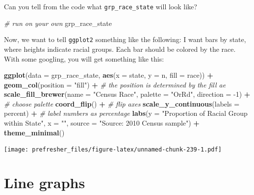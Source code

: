 \documentclass[
]{book}
\newenvironment{Shaded}{\begin{snugshade}}{\end{snugshade}}
\newcommand{\CommentTok}[1]{\textcolor[rgb]{0.56,0.35,0.01}{\textit{#1}}}
\newcommand{\DataTypeTok}[1]{\textcolor[rgb]{0.13,0.29,0.53}{#1}}
\newcommand{\DecValTok}[1]{\textcolor[rgb]{0.00,0.00,0.81}{#1}}
\newcommand{\KeywordTok}[1]{\textcolor[rgb]{0.13,0.29,0.53}{\textbf{#1}}}
\newcommand{\NormalTok}[1]{#1}
\newcommand{\OperatorTok}[1]{\textcolor[rgb]{0.81,0.36,0.00}{\textbf{#1}}}
\newcommand{\StringTok}[1]{\textcolor[rgb]{0.31,0.60,0.02}{#1}}
\theoremstyle{definition}
\theoremstyle{definition}
\theoremstyle{definition}
\theoremstyle{remark}
\begin{document}
Can you tell from the code what \texttt{grp\_race\_state} will look like?

\begin{Shaded}
\begin{Highlighting}[]
\CommentTok{\# run on your own}
\NormalTok{grp\_race\_state}
\end{Highlighting}
\end{Shaded}

Now, we want to tell \texttt{ggplot2} something like the following: I want bars by state, where heights indicate racial groups. Each bar should be colored by the race. With some googling, you will get something like this:

\begin{Shaded}
\begin{Highlighting}[]
\KeywordTok{ggplot}\NormalTok{(}\DataTypeTok{data =}\NormalTok{ grp\_race\_state, }\KeywordTok{aes}\NormalTok{(}\DataTypeTok{x =}\NormalTok{  state, }\DataTypeTok{y =}\NormalTok{ n,  }\DataTypeTok{fill =}\NormalTok{ race)) }\OperatorTok{+}
\StringTok{  }\KeywordTok{geom\_col}\NormalTok{(}\DataTypeTok{position =} \StringTok{"fill"}\NormalTok{) }\OperatorTok{+}\StringTok{ }\CommentTok{\# the position is determined by the fill ae}
\StringTok{  }\KeywordTok{scale\_fill\_brewer}\NormalTok{(}\DataTypeTok{name =} \StringTok{"Census Race"}\NormalTok{, }\DataTypeTok{palette =} \StringTok{"OrRd"}\NormalTok{, }\DataTypeTok{direction =} \DecValTok{{-}1}\NormalTok{) }\OperatorTok{+}\StringTok{ }\CommentTok{\# choose palette}
\StringTok{  }\KeywordTok{coord\_flip}\NormalTok{() }\OperatorTok{+}\StringTok{ }\CommentTok{\# flip axes}
\StringTok{  }\KeywordTok{scale\_y\_continuous}\NormalTok{(}\DataTypeTok{labels =}\NormalTok{ percent) }\OperatorTok{+}\StringTok{ }\CommentTok{\# label numbers as percentage}
\StringTok{  }\KeywordTok{labs}\NormalTok{(}\DataTypeTok{y =} \StringTok{"Proportion of Racial Group within State"}\NormalTok{,}
       \DataTypeTok{x =} \StringTok{""}\NormalTok{,}
       \DataTypeTok{source =} \StringTok{"Source: 2010 Census  sample"}\NormalTok{) }\OperatorTok{+}
\StringTok{  }\KeywordTok{theme\_minimal}\NormalTok{()}
\end{Highlighting}
\end{Shaded}

\texttt{[image: prefresher\_files/figure-latex/unnamed-chunk-239-1.pdf]}

\hypertarget{line-graphs}{%
\section{Line graphs}\label{line-graphs}}
\end{document}
